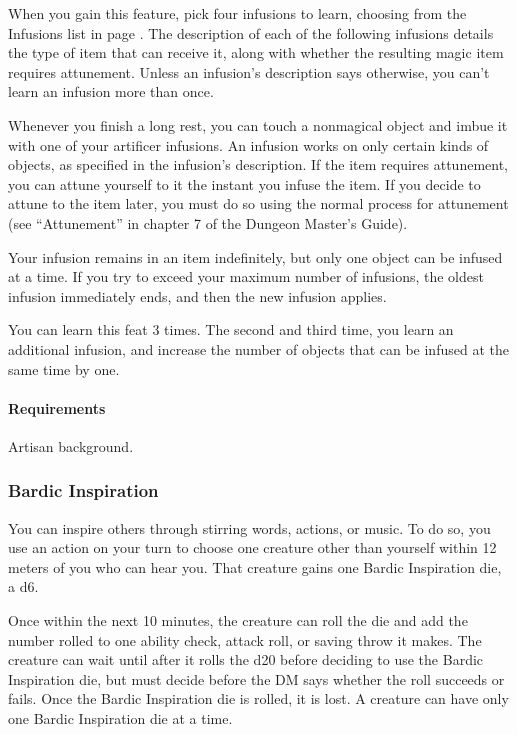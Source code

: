     When you gain this feature, pick four infusions to learn, choosing from the Infusions list in page \pageref{ssec::infusions}.
    The description of each of the following infusions details the type of item that can receive it, along with whether the resulting magic item requires attunement.
    Unless an infusion's description says otherwise, you can't learn an infusion more than once.

    Whenever you finish a long rest, you can touch a nonmagical object and imbue it with one of your artificer infusions.
    An infusion works on only certain kinds of objects, as specified in the infusion's description.
    If the item requires attunement, you can attune yourself to it the instant you infuse the item.
    If you decide to attune to the item later, you must do so using the normal process for attunement (see ``Attunement'' in chapter 7 of the Dungeon Master's Guide).

    Your infusion remains in an item indefinitely, but only one object can be infused at a time.
    If you try to exceed your maximum number of infusions, the oldest infusion immediately ends, and then the new infusion applies.

    You can learn this feat 3 times.
    The second and third time, you learn an additional infusion, and increase the number of objects that can be infused at the same time by one.

    \paragraph{Requirements} Artisan background.
\subsubsection{Bardic Inspiration} \label{feat::bardicinspiration}
    You can inspire others through stirring words, actions, or music.
    To do so, you use an action on your turn to choose one creature other than yourself within 12 meters of you who can hear you.
    That creature gains one Bardic Inspiration die, a d6.

    Once within the next 10 minutes, the creature can roll the die and add the number rolled to one ability check, attack roll, or saving throw it makes.
    The creature can wait until after it rolls the d20 before deciding to use the Bardic Inspiration die, but must decide before the DM says whether the roll succeeds or fails.
    Once the Bardic Inspiration die is rolled, it is lost.
    A creature can have only one Bardic Inspiration die at a time.

